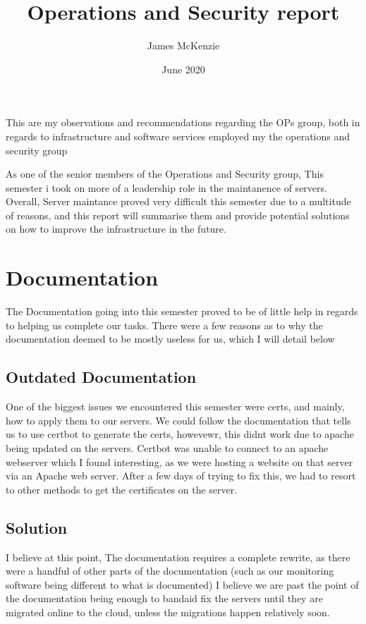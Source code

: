 \documentclass{article}
\begin{document}
\title{Operations and Security report}
\author{James McKenzie}
\date{June 2020}
\maketitle
This are my observations and recommendations regarding the OPs group, both in regards to infrastructure and software services employed my the operations and
security group
\newline

As one of the senior members of the Operations and Security group, This semester i took on more of a leadership role in the maintanence of servers. 
Overall, Server maintance proved very difficult this semester due to a multitude of reasons, and this report will summarise them and provide potential
solutions on how to improve the infrastructure in the future.

\section{Documentation}
The Documentation going into this semester proved to be of little help in regards to helping us complete our tasks. There were a few reasons as to why
the documentation deemed to be mostly useless for us, which I will detail below
\subsection{Outdated Documentation}
One of the biggest issues we encountered this semester were certs, and mainly, how to apply them to our servers. We could follow the documentation that tells us to 
use certbot to generate the certs, howevewr, this didnt work due to apache being updated on the servers. Certbot was unable to connect to an apache webserver which I found interesting, as we were hosting a website on that server via an Apache web server. After a few days of trying to fix this, we had to resort to other methods
to get the certificates on the server. 
\subsection*{Solution}
I believe at this point, The documentation requires a complete rewrite, as there were a handful of other parts of the documentation (such as our monitoring software 
being different to what is documented) 
I believe we are past the point of the documentation being enough to bandaid fix the servers until they are migrated online to the cloud, unless the migrations happen relatively soon.
\end{document}
